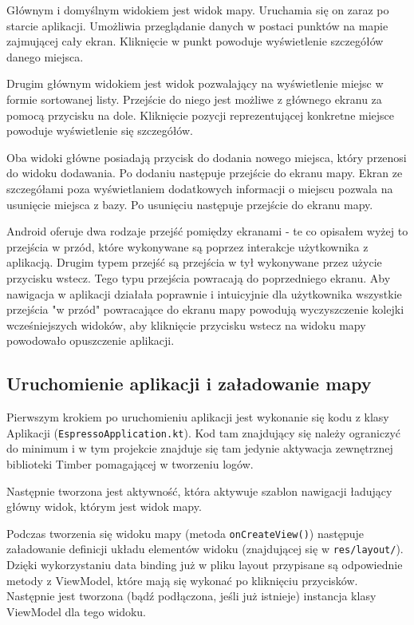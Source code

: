 \documentclass[polish,polish,a4paper,12pt]{article}
\begin{document}
		Głównym i domyślnym widokiem jest widok mapy. Uruchamia się on zaraz po starcie aplikacji. Umożliwia przeglądanie danych w postaci punktów na mapie zajmującej cały ekran. Kliknięcie w punkt powoduje wyświetlenie szczegółów danego miejsca.

		Drugim głównym widokiem jest widok pozwalający na wyświetlenie miejsc w formie sortowanej listy. Przejście do niego jest możliwe z głównego ekranu za pomocą przycisku na dole. Kliknięcie pozycji reprezentującej konkretne miejsce powoduje wyświetlenie się szczegółów.

		Oba widoki główne posiadają przycisk do dodania nowego miejsca, który przenosi do widoku dodawania. Po dodaniu następuje przejście do ekranu mapy. Ekran ze szczegółami poza wyświetlaniem dodatkowych informacji o miejscu pozwala na usunięcie miejsca z bazy. Po usunięciu następuje przejście do ekranu mapy.

		Android oferuje dwa rodzaje przejść pomiędzy ekranami - te co opisałem wyżej to przejścia w przód, które wykonywane są poprzez interakcje użytkownika z aplikacją. Drugim typem przejść są przejścia w tył wykonywane przez użycie przycisku wstecz. Tego typu przejścia powracają do poprzedniego ekranu. Aby nawigacja w aplikacji działała poprawnie i intuicyjnie dla użytkownika wszystkie przejścia "w przód" powracające do ekranu mapy powodują wyczyszczenie kolejki wcześniejszych widoków, aby kliknięcie przycisku wstecz na widoku mapy powodowało opuszczenie aplikacji.

	\subsection{Uruchomienie aplikacji i załadowanie mapy}

	Pierwszym krokiem po uruchomieniu aplikacji jest wykonanie się kodu z klasy Aplikacji (\texttt{EspressoApplication.kt}). Kod tam znajdujący się należy ograniczyć do minimum i w tym projekcie znajduje się tam jedynie aktywacja zewnętrznej biblioteki Timber pomagającej w tworzeniu logów.

	Następnie tworzona jest aktywność, która aktywuje szablon nawigacji ładujący główny widok, którym jest widok mapy.

	Podczas tworzenia się widoku mapy (metoda \texttt{onCreateView()}) następuje załadowanie definicji układu elementów widoku (znajdującej się w \texttt{res/layout/}). Dzięki wykorzystaniu data binding już w pliku layout przypisane są odpowiednie metody z ViewModel, które mają się wykonać po kliknięciu przycisków. Następnie jest tworzona (bądź podłączona, jeśli już istnieje) instancja klasy ViewModel dla tego widoku.
\end{document}
